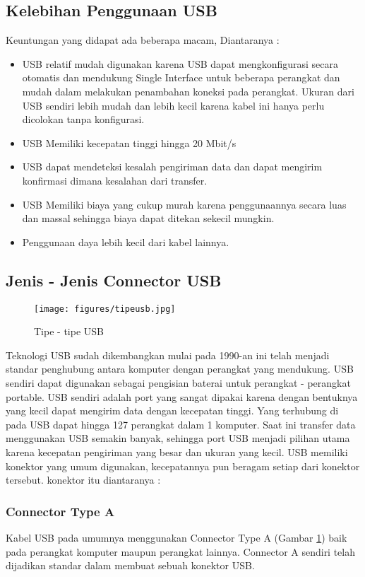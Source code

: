 \subsection{Kelebihan Penggunaan USB}
Keuntungan yang didapat ada beberapa macam, Diantaranya : 
\begin{itemize} 
\item USB relatif mudah digunakan karena USB dapat mengkonfigurasi secara otomatis dan mendukung Single Interface untuk beberapa perangkat dan mudah dalam melakukan penambahan koneksi pada perangkat. Ukuran dari USB sendiri lebih mudah dan lebih kecil karena kabel ini hanya perlu dicolokan tanpa konfigurasi.
\item USB Memiliki kecepatan tinggi hingga 20 Mbit/s
\item USB dapat mendeteksi kesalah pengiriman data dan dapat mengirim konfirmasi dimana kesalahan dari transfer.
\item USB Memiliki biaya yang cukup murah karena penggunaannya secara luas dan massal sehingga biaya dapat ditekan sekecil mungkin.
\item Penggunaan daya lebih kecil dari kabel lainnya.
\end{itemize}
\subsection{Jenis - Jenis Connector USB}
\begin{figure}[ht]
\centerline{\texttt{[image: figures/tipeusb.jpg]}}
\caption{Tipe - tipe USB}
\label{tipeusb}
\end{figure}
Teknologi USB sudah dikembangkan mulai pada 1990-an ini telah menjadi standar penghubung antara komputer dengan perangkat yang mendukung. USB sendiri dapat digunakan sebagai pengisian baterai untuk perangkat - perangkat portable.
USB sendiri adalah port yang sangat dipakai karena dengan bentuknya yang kecil dapat mengirim data dengan kecepatan tinggi. Yang terhubung di pada USB dapat hingga 127 perangkat dalam 1 komputer. Saat ini transfer data menggunakan USB semakin banyak, sehingga port USB menjadi pilihan utama karena kecepatan pengiriman yang besar dan ukuran yang kecil. 
USB memiliki konektor yang umum digunakan, kecepatannya pun beragam setiap dari konektor tersebut. konektor itu diantaranya : 
\subsubsection{Connector Type A}
Kabel USB pada umumnya menggunakan Connector Type A (Gambar \ref{tipeusb}) baik pada perangkat komputer maupun perangkat lainnya. Connector A sendiri telah dijadikan standar dalam membuat sebuah konektor USB.
